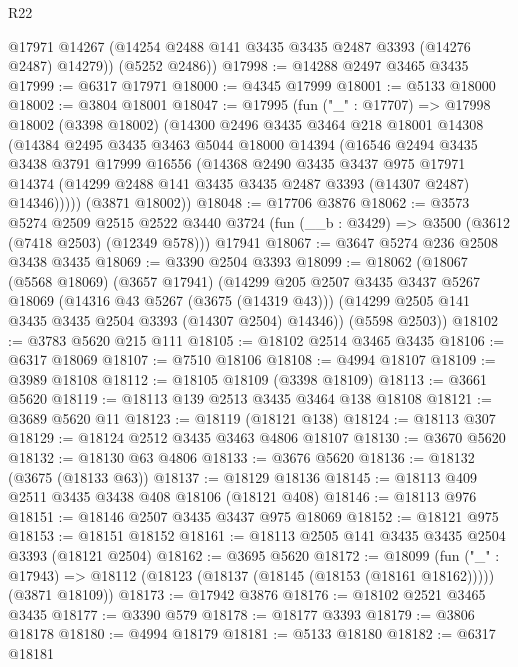 \begin{lexlean}{R22}
\begin{coremodule}
        @17971
        @14267
        (@14254 @2488 @141 @3435 @3435 @2487 @3393 (@14276 @2487) @14279))
      (@5252 @2486))
@17998 := @14288 @2497 @3465 @3435
@17999 := @6317 @17971
@18000 := @4345 @17999
@18001 := @5133 @18000
@18002 := @3804 @18001
@18047 := @17995
    (fun ("_" : @17707) =>
    @17998
      @18002
      (@3398 @18002)
      (@14300
        @2496
        @3435
        @3464
        @218
        @18001
        @14308
        (@14384
          @2495
          @3435
          @3463
          @5044
          @18000
          @14394
          (@16546
            @2494
            @3435
            @3438
            @3791
            @17999
            @16556
            (@14368
              @2490
              @3435
              @3437
              @975
              @17971
              @14374
              (@14299 @2488 @141 @3435 @3435 @2487 @3393 (@14307 @2487) @14346)))))
      (@3871 @18002))
@18048 := @17706 @3876
@18062 := @3573
    @5274
    @2509
    @2515
    @2522
    @3440
    @3724
    (fun (__b : @3429) => @3500 (@3612 (@7418 @2503) (@12349 @578)))
    @17941
@18067 := @3647 @5274 @236 @2508 @3438 @3435
@18069 := @3390 @2504 @3393
@18099 := @18062
    (@18067
      (@5568 @18069)
      (@3657 @17941)
      (@14299
        @205
        @2507
        @3435
        @3437
        @5267
        @18069
        (@14316 @43 @5267 (@3675 (@14319 @43)))
        (@14299 @2505 @141 @3435 @3435 @2504 @3393 (@14307 @2504) @14346))
      (@5598 @2503))
@18102 := @3783 @5620 @215 @111
@18105 := @18102 @2514 @3465 @3435
@18106 := @6317 @18069
@18107 := @7510 @18106
@18108 := @4994 @18107
@18109 := @3989 @18108
@18112 := @18105 @18109 (@3398 @18109)
@18113 := @3661 @5620
@18119 := @18113 @139 @2513 @3435 @3464 @138 @18108
@18121 := @3689 @5620 @11
@18123 := @18119 (@18121 @138)
@18124 := @18113 @307
@18129 := @18124 @2512 @3435 @3463 @4806 @18107
@18130 := @3670 @5620
@18132 := @18130 @63 @4806
@18133 := @3676 @5620
@18136 := @18132 (@3675 (@18133 @63))
@18137 := @18129 @18136
@18145 := @18113 @409 @2511 @3435 @3438 @408 @18106 (@18121 @408)
@18146 := @18113 @976
@18151 := @18146 @2507 @3435 @3437 @975 @18069
@18152 := @18121 @975
@18153 := @18151 @18152
@18161 := @18113 @2505 @141 @3435 @3435 @2504 @3393 (@18121 @2504)
@18162 := @3695 @5620
@18172 := @18099
    (fun ("_" : @17943) =>
    @18112 (@18123 (@18137 (@18145 (@18153 (@18161 @18162))))) (@3871 @18109))
@18173 := @17942 @3876
@18176 := @18102 @2521 @3465 @3435
@18177 := @3390 @579
@18178 := @18177 @3393
@18179 := @3806 @18178
@18180 := @4994 @18179
@18181 := @5133 @18180
@18182 := @6317 @18181

\end{coremodule}
\end{lexlean}
